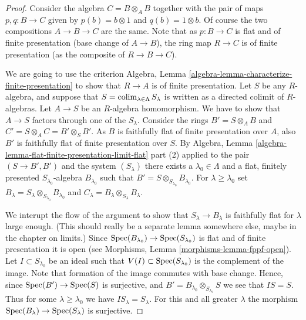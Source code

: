 \begin{proof}
Consider the algebra $C = B \otimes_A B$ together with the
pair of maps $p, q : B \to C$ given by $p(b) = b \otimes 1$
and $q(b) = 1 \otimes b$. Of course the two compositions
$A \to B \to C$ are the same. Note that as
$p : B \to C$ is flat and of finite presentation (base change of
$A \to B$), the ring map $R \to C$ is of finite presentation
(as the composite of $R \to B \to C$).

\medskip\noindent
We are going to use the criterion
Algebra, Lemma \ref{algebra-lemma-characterize-finite-presentation}
to show that $R \to A$ is of finite presentation.
Let $S$ be any $R$-algebra, and suppose that
$S = \mathop{\rm colim}\nolimits_{\lambda \in \Lambda} S_\lambda$ is written
as a directed colimit of $R$-algebras.
Let $A \to S$ be an $R$-algebra homomorphism. We have to
show that $A \to S$ factors through one of the $S_\lambda$.
Consider the rings $B' = S \otimes_A B$ and
$C' = S \otimes_A C = B' \otimes_S B'$.
As $B$ is faithfully flat of finite presentation over $A$, also $B'$
is faithfully flat of finite presentation over $S$.
By Algebra, Lemma \ref{algebra-lemma-flat-finite-presentation-limit-flat}
part (2) applied to the pair $(S \to B', B')$ and the system $(S_\lambda)$
there exists a $\lambda_0 \in \Lambda$
and a flat, finitely presented $S_{\lambda_0}$-algebra
$B_{\lambda_0}$ such that $B' = S \otimes_{S_{\lambda_0}} B_{\lambda_0}$.
For $\lambda \geq \lambda_0$ set
$B_\lambda = S_\lambda \otimes_{S_{\lambda_0}} B_{\lambda_0}$ and
$C_\lambda = B_\lambda \otimes_{S_\lambda} B_\lambda$.

\medskip\noindent
We interupt the flow of the argument to show that $S_\lambda \to B_\lambda$
is faithfully flat for $\lambda$ large enough. (This should really
be a separate lemma somewhere else, maybe in the chapter on limits.)
Since $\mathop{\rm Spec}(B_{\lambda_0}) \to \mathop{\rm Spec}(S_{\lambda_0})$ is
flat and of finite presentation it is open (see Morphisms,
Lemma \ref{morphisms-lemma-fppf-open}).
Let $I \subset S_{\lambda_0}$ be an ideal such that
$V(I) \subset \mathop{\rm Spec}(S_{\lambda_0})$ is the complement
of the image. Note that formation of the image commutes
with base change. Hence, since $\mathop{\rm Spec}(B') \to \mathop{\rm Spec}(S)$
is surjective, and $B' = B_{\lambda_0} \otimes_{S_{\lambda_0}} S$
we see that $IS = S$. Thus for some $\lambda \geq \lambda_0$ we
have $IS_{\lambda} = S_\lambda$. For this and all greater
$\lambda$ the morphism
$\mathop{\rm Spec}(B_\lambda) \to \mathop{\rm Spec}(S_\lambda)$ is surjective.


\end{proof}
